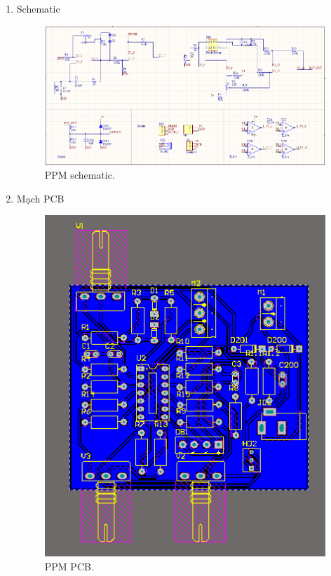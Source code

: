 \documentclass[a4paper,12pt,oneside]{article}
\begin{document}
\begin{enumerate}
\item Schematic

\begin{figure}[H]
\centering
\begin{center}
\includegraphics[scale=.65]{hinh/PPM/schematic_ppm.PNG}
\end{center}
\caption{PPM schematic.}
\end{figure}

\item Mạch PCB

\begin{figure}[H]
\centering
\begin{center}
\includegraphics[scale=.7]{hinh/PPM/pcb_ppm.PNG}
\end{center}
\caption{PPM PCB.}
\end{figure}

\end{enumerate}
\end{document}
